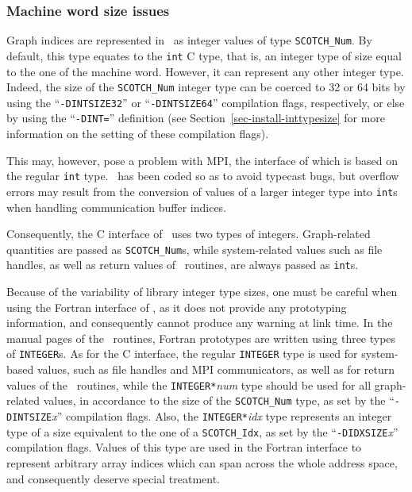\subsubsection{Machine word size issues}
\label{sec-lib-inttypesize}

Graph indices are represented in \scotch\ as integer values of type
{\tt SCOTCH\_\lbt Num}. By default, this type equates to the {\tt int}
C type, that is, an integer type of size equal to the one of 
the machine word. However, it can represent any other integer
type. Indeed, the size of the {\tt SCOTCH\_\lbt Num} integer type can
be coerced to 32 or 64 bits by using the ``{\tt -DINTSIZE32}'' or
``{\tt -DINTSIZE64}'' compilation flags, respectively, or else by
using the ``{\tt -DINT=}'' definition (see
Section~\ref{sec-install-inttypesize} for more information on the
setting of these compilation flags).

This may, however, pose a problem with MPI, the interface of which is
based on the regular {\tt int} type. \ptscotch\ has been coded so
as to avoid typecast bugs, but overflow errors may result from the
conversion of values of a larger integer type into {\tt int}s when
handling communication buffer indices.

Consequently, the C interface of \scotch\ uses two types of integers.
Graph-related quantities are passed as {\tt SCOTCH\_\lbt Num}s,
while system-related values such as file handles, as well as
return values of \libscotch\ routines, are always passed as
{\tt int}s.

Because of the variability of library integer type sizes, one must be
careful when using the Fortran interface of \scotch, as it does not
provide any prototyping information, and consequently cannot produce
any warning at link time. In the manual pages of the
\libscotch\ routines, Fortran prototypes are written using three types
of {\tt INTEGER}s. As for the C interface, the regular {\tt INTEGER}
type is used for system-based values, such as file handles and MPI
communicators, as well as for return values of the
\libscotch\ routines, while the {\tt INTEGER*}{\it num} type
should be used for all graph-related values, in accordance to the size
of the {\tt SCOTCH\_\lbt Num} type, as set by the
``{\tt -DINTSIZE}{\it x}'' compilation flags. Also, the
{\tt INTEGER*}{\it idx} type represents an integer type of a size
equivalent to the one of a {\tt SCOTCH\_\lbt Idx}, as set by the
``{\tt -DIDXSIZE}{\it x}'' compilation flags. Values of this type are
used in the Fortran interface to represent arbitrary array indices
which can span across the whole address space, and consequently
deserve special treatment.

